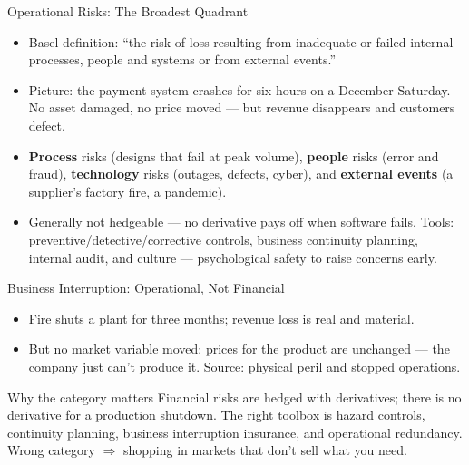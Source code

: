 \documentclass[11pt, aspectratio=169]{beamer}
\begin{document}
\begin{frame}{Operational Risks: The Broadest Quadrant}
\begin{itemize}
  \item Basel definition: ``the risk of loss resulting from inadequate or failed internal processes, people and systems or from external events.''
  \item Picture: the payment system crashes for six hours on a December Saturday. No asset damaged, no price moved --- but revenue disappears and customers defect.
  \item \textbf{Process} risks (designs that fail at peak volume), \textbf{people} risks (error and fraud), \textbf{technology} risks (outages, defects, \alert{cyber}), and \textbf{external events} (a supplier's factory fire, a pandemic).
  \item Generally \alert{not hedgeable} --- no derivative pays off when software fails. Tools: preventive/detective/corrective controls, business continuity planning, internal audit, and \alert{culture} --- psychological safety to raise concerns early.
\end{itemize}
\end{frame}

\begin{frame}{Business Interruption: Operational, Not Financial}
\begin{itemize}
  \item Fire shuts a plant for three months; revenue loss is real and material.
  \item But no market variable moved: prices for the product are unchanged --- \alert{the company just can't produce it}. Source: physical peril and stopped operations.
\end{itemize}
\medskip
\begin{block}{Why the category matters}
Financial risks are hedged with derivatives; there is no derivative for a production shutdown. The right toolbox is hazard controls, continuity planning, \alert{business interruption insurance}, and operational redundancy. Wrong category $\Rightarrow$ shopping in markets that don't sell what you need.
\end{block}
\end{frame}
\end{document}
